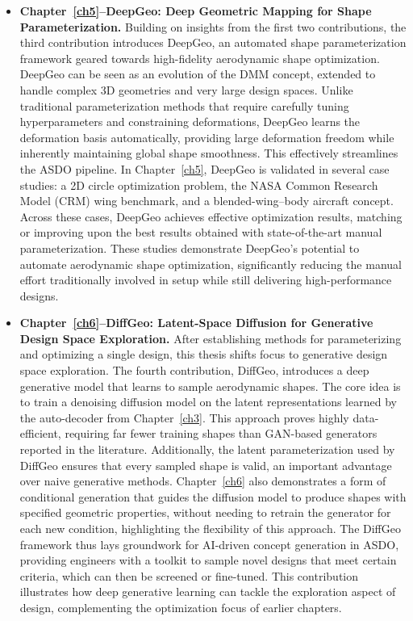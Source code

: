 \begin{itemize}
    \item \textbf{Chapter~\ref{ch5}--DeepGeo: Deep Geometric Mapping for Shape Parameterization.} Building on insights from the first two contributions, the third contribution introduces DeepGeo, an automated shape parameterization framework geared towards high-fidelity aerodynamic shape optimization. DeepGeo can be seen as an evolution of the DMM concept, extended to handle complex 3D geometries and very large design spaces. Unlike traditional parameterization methods that require carefully tuning hyperparameters and constraining deformations, DeepGeo learns the deformation basis automatically, providing large deformation freedom while inherently maintaining global shape smoothness. This effectively streamlines the ASDO pipeline. In Chapter~\ref{ch5}, DeepGeo is validated in several case studies: a 2D circle optimization problem, the NASA Common Research Model (CRM) wing benchmark, and a blended-wing–body aircraft concept. Across these cases, DeepGeo achieves effective optimization results, matching or improving upon the best results obtained with state-of-the-art manual parameterization. These studies demonstrate DeepGeo’s potential to automate aerodynamic shape optimization, significantly reducing the manual effort traditionally involved in setup while still delivering high-performance designs.

    \item \textbf{Chapter~\ref{ch6}--DiffGeo: Latent-Space Diffusion for Generative Design Space Exploration.} After establishing methods for parameterizing and optimizing a single design, this thesis shifts focus to generative design space exploration. The fourth contribution, DiffGeo, introduces a deep generative model that learns to sample aerodynamic shapes. The core idea is to train a denoising diffusion model on the latent representations learned by the auto-decoder from Chapter~\ref{ch3}. This approach proves highly data-efficient, requiring far fewer training shapes than GAN-based generators reported in the literature. Additionally, the latent parameterization used by DiffGeo ensures that every sampled shape is valid, an important advantage over naive generative methods. Chapter~\ref{ch6} also demonstrates a form of conditional generation that guides the diffusion model to produce shapes with specified geometric properties, without needing to retrain the generator for each new condition, highlighting the flexibility of this approach. The DiffGeo framework thus lays groundwork for AI-driven concept generation in ASDO, providing engineers with a toolkit to sample novel designs that meet certain criteria, which can then be screened or fine-tuned. This contribution illustrates how deep generative learning can tackle the exploration aspect of design, complementing the optimization focus of earlier chapters.


\end{itemize}
